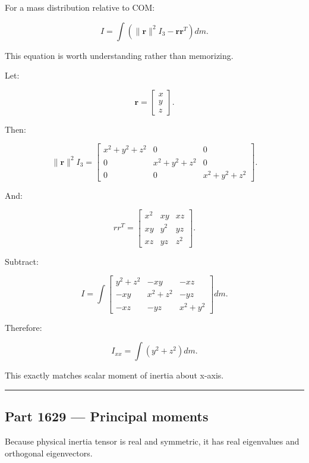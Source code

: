 For a mass distribution relative to COM:

\[
\boxed{
I
=
\int
\left(
\|\mathbf{r}\|^2I_3
-
\mathbf{r}\mathbf{r}^T
\right)
dm.
}
\]

This equation is worth understanding rather than memorizing.

Let:

\[
\mathbf{r}
=
\begin{bmatrix}
x\\y\\z
\end{bmatrix}.
\]

Then:

\[
\|\mathbf{r}\|^2I_3
=
\begin{bmatrix}
x^2+y^2+z^2 &0&0\\
0&x^2+y^2+z^2&0\\
0&0&x^2+y^2+z^2
\end{bmatrix}.
\]

And:

\[
rr^T
=
\begin{bmatrix}
x^2&xy&xz\\
xy&y^2&yz\\
xz&yz&z^2
\end{bmatrix}.
\]

Subtract:

\[
I=
\int
\begin{bmatrix}
y^2+z^2&-xy&-xz\\
-xy&x^2+z^2&-yz\\
-xz&-yz&x^2+y^2
\end{bmatrix}
dm.
\]

Therefore:

\[
I_{xx}
=
\int(y^2+z^2)dm.
\]

This exactly matches scalar moment of inertia about x-axis.

\begin{center}\rule{0.5\linewidth}{0.5pt}\end{center}

\subsection{Part 1629 --- Principal moments}\label{06-engine-ii-ch035-part-1629-principal-moments}

\hypertarget{06-engine-ii-ch035-part-1629-principal-moments}{}

Because physical inertia tensor is real and symmetric, it has real eigenvalues and orthogonal eigenvectors.

